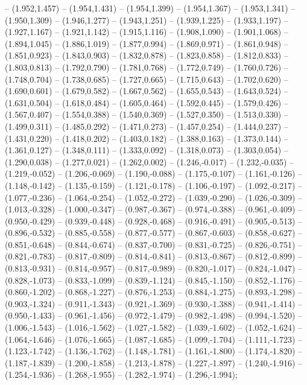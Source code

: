 -- (1.952,1.457) -- (1.954,1.431) -- (1.954,1.399) -- (1.954,1.367) -- (1.953,1.341) -- (1.950,1.309) -- (1.946,1.277) -- (1.943,1.251) -- (1.939,1.225) -- (1.933,1.197) -- (1.927,1.167) -- (1.921,1.142) -- (1.915,1.116) -- (1.908,1.090) -- (1.901,1.068) -- (1.894,1.045) -- (1.886,1.019) -- (1.877,0.994) -- (1.869,0.971) -- (1.861,0.948) -- (1.851,0.923) -- (1.843,0.903) -- (1.832,0.878) -- (1.823,0.858) -- (1.812,0.833) -- (1.803,0.813) -- (1.792,0.790) -- (1.781,0.768) -- (1.772,0.749) -- (1.760,0.726) -- (1.748,0.704) -- (1.738,0.685) -- (1.727,0.665) -- (1.715,0.643) -- (1.702,0.620) -- (1.690,0.601) -- (1.679,0.582) -- (1.667,0.562) -- (1.655,0.543) -- (1.643,0.524) -- (1.631,0.504) -- (1.618,0.484) -- (1.605,0.464) -- (1.592,0.445) -- (1.579,0.426) -- (1.567,0.407) -- (1.554,0.388) -- (1.540,0.369) -- (1.527,0.350) -- (1.513,0.330) -- (1.499,0.311) -- (1.485,0.292) -- (1.471,0.273) -- (1.457,0.254) -- (1.444,0.237) -- (1.431,0.220) -- (1.418,0.202) -- (1.403,0.182) -- (1.388,0.163) -- (1.373,0.144) -- (1.361,0.127) -- (1.348,0.111) -- (1.333,0.092) -- (1.318,0.073) -- (1.303,0.054) -- (1.290,0.038) -- (1.277,0.021) -- (1.262,0.002) -- (1.246,-0.017) -- (1.232,-0.035) -- (1.219,-0.052) -- (1.206,-0.069) -- (1.190,-0.088) -- (1.175,-0.107) -- (1.161,-0.126) -- (1.148,-0.142) -- (1.135,-0.159) -- (1.121,-0.178) -- (1.106,-0.197) -- (1.092,-0.217) -- (1.077,-0.236) -- (1.064,-0.254) -- (1.052,-0.272) -- (1.039,-0.290) -- (1.026,-0.309) -- (1.013,-0.328) -- (1.000,-0.347) -- (0.987,-0.367) -- (0.974,-0.388) -- (0.961,-0.409) -- (0.950,-0.429) -- (0.939,-0.448) -- (0.928,-0.468) -- (0.916,-0.491) -- (0.905,-0.513) -- (0.896,-0.532) -- (0.885,-0.558) -- (0.877,-0.577) -- (0.867,-0.603) -- (0.858,-0.627) -- (0.851,-0.648) -- (0.844,-0.674) -- (0.837,-0.700) -- (0.831,-0.725) -- (0.826,-0.751) -- (0.821,-0.783) -- (0.817,-0.809) -- (0.814,-0.841) -- (0.813,-0.867) -- (0.812,-0.899) -- (0.813,-0.931) -- (0.814,-0.957) -- (0.817,-0.989) -- (0.820,-1.017) -- (0.824,-1.047) -- (0.828,-1.073) -- (0.833,-1.099) -- (0.839,-1.124) -- (0.845,-1.150) -- (0.852,-1.176) -- (0.860,-1.202) -- (0.868,-1.227) -- (0.876,-1.253) -- (0.884,-1.275) -- (0.893,-1.298) -- (0.903,-1.324) -- (0.911,-1.343) -- (0.921,-1.369) -- (0.930,-1.388) -- (0.941,-1.414) -- (0.950,-1.433) -- (0.961,-1.456) -- (0.972,-1.479) -- (0.982,-1.498) -- (0.994,-1.520) -- (1.006,-1.543) -- (1.016,-1.562) -- (1.027,-1.582) -- (1.039,-1.602) -- (1.052,-1.624) -- (1.064,-1.646) -- (1.076,-1.665) -- (1.087,-1.685) -- (1.099,-1.704) -- (1.111,-1.723) -- (1.123,-1.742) -- (1.136,-1.762) -- (1.148,-1.781) -- (1.161,-1.800) -- (1.174,-1.820) -- (1.187,-1.839) -- (1.200,-1.858) -- (1.213,-1.878) -- (1.227,-1.897) -- (1.240,-1.916) -- (1.254,-1.936) -- (1.268,-1.955) -- (1.282,-1.974) -- (1.296,-1.994);
